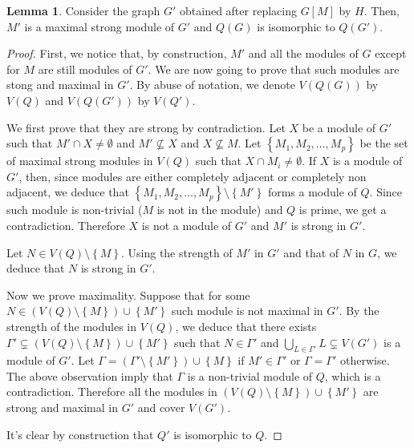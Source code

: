 \documentclass{article}
\theoremstyle{definition}
\newtheorem{lemma}[thm]{Lemma}
\begin{document}
    \begin{lemma} \label{for thm}
        Consider the graph $G'$
        obtained after replacing
        $G\left[M\right]$ by $H$.
        Then, $M'$ is a maximal
        strong module of $G'$ 
        and $Q\left(G\right)$
        is isomorphic to
        $Q\left(G'\right)$.
    \end{lemma}
    \begin{proof}
    First, we notice that, by construction,
    $M'$ and all the modules of $G$
    except for $M$ are still modules of $G'$.
    We are now going to prove that such modules
    are stong and maximal in $G'$.
    By abuse of notation,
    we denote $V\left(Q\left(G\right)\right)$ 
    by $V\left(Q\right)$
    and $V\left(Q\left(G'\right)\right)$ 
    by $V\left(Q'\right)$.

    We first prove that they are strong by contradiction.
    Let $X$ be a module of $G'$ such that $M' \cap X \neq \emptyset$
    and $M' \not \subseteq X$ and $X \not \subseteq M$.
    Let $\left\{M_1, M_2, \ldots, M_{p}\right\}$ be the set of maximal strong modules
    in $V\left(Q\right)$ such 
    that $X \cap M_{i} \neq \emptyset$.
    If $X$ is a module of $G'$, then, since modules are either completely
    adjacent or completely non adjacent, we deduce that $\left\{M_1, M_2, \ldots, M_{p}\right\}
    \setminus \left\{M'\right\}$
    forms a module of $Q$. Since such module is non-trivial ($M$ is
    not in the module)
    and $Q$ is prime, we get a contradiction.
    Therefore $X$ is not a module of $G'$ and $M'$ is strong in $G'$.

    Let $N \in V\left(Q\right) \setminus \left\{M\right\}$.
    Using the strength of $M'$ in $G'$ and that of $N$ in $G$, 
    we deduce that $N$ is strong in $G'$.
    
    Now we prove maximality. Suppose that for some $N \in \left(V\left(Q\right)
        \setminus \left\{M\right\} \right) \cup \left\{M'\right\}$
    such module is not maximal in $G'$. By the strength of the modules
    in $V\left(Q\right)$, we deduce that there exists
    $\Gamma' \subsetneq \left(V\left(Q\right) \setminus \left\{M\right\}\right) 
    \cup \left\{M'\right\}$ such that $N \in \Gamma'$ and
    $\bigcup_{L \in \Gamma'} L \subsetneq V\left(G'\right)$ is a module of $G'$.
    Let $\Gamma = \left(\Gamma' \setminus \left\{M'\right\}\right) \cup \left\{M\right\}$ 
    if $M' \in \Gamma'$ or $\Gamma = \Gamma'$ otherwise.
    The above observation imply that $\Gamma$ is a non-trivial module of $Q$, which is a contradiction.
    Therefore all the modules in $\left(V\left(Q\right) \setminus \left\{M\right\}\right)
    \cup \left\{M'\right\}$ are strong and maximal
    in $G'$ and cover $V\left(G'\right)$.
    
    It's clear by construction that $Q'$ 
    is isomorphic to $Q$.
    \end{proof}
    
\end{document}
